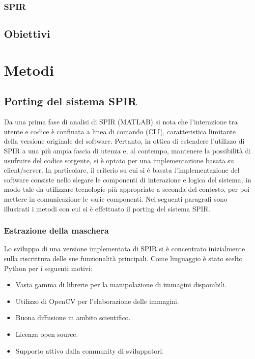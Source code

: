 \documentclass[a4paper,12pt]{report}
\begin{document}
    \subsection{SPIR}
  \section{Obiettivi}

\chapter{Metodi}
  \section{Porting del sistema SPIR}
    Da una prima fase di analisi di SPIR (MATLAB) si nota che l'interazione tra utente e codice è confinata
    a linea di comando (CLI), caratteristica limitante della versione originale del software. Pertanto, in ottica di estendere l'utilizzo di SPIR a una più ampia
    fascia di utenza e, al contempo, mantenere la possibilità di usufruire del codice sorgente, si è optato per una implementazione basata su client/server.
    In particolare, il criterio su cui si è basata l'implementazione del software consiste nello slegare le componenti di interazione e logica del sistema, in modo tale da utilizzare tecnologie più appropriate a seconda del contesto, per poi mettere in comunicazione le 
    varie componenti. Nei seguenti paragrafi sono illustrati i metodi con cui si è effettuato il porting del sistema SPIR.
    \subsection{Estrazione della maschera}
      Lo sviluppo di una versione implementata di SPIR si è concentrato inizialmente sulla riscrittura delle sue funzionalità principali.
      Come linguaggio è stato scelto Python per i seguenti motivi:
      \begin{itemize}
        \item Vasta gamma di librerie per la manipolazione di immagini disponibili.
        \item Utilizzo di OpenCV \cite{opencv_library} per l'elaborazione delle immagini.
        \item Buona diffusione in ambito scientifico.
        \item Licenza open source.
        \item Supporto attivo dalla community di sviluppatori.

      \end{itemize}
      
\end{document}
